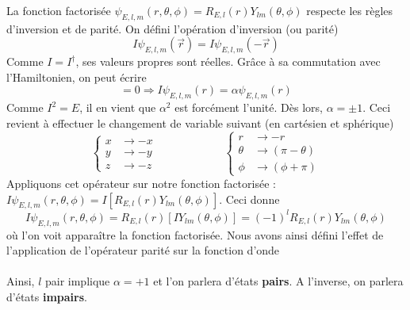 La fonction factorisée $\psi_{E,l,m}(r,\theta,\phi) = R_{E,l}(r)Y_{lm}(\theta,\phi)$ respecte les règles 
d'inversion et de parité. On défini l'opération d'inversion (ou parité)
\begin{equation}
I\psi_{E,l,m}(\vec{r}) = I\psi_{E,l,m}(-\vec{r})
\end{equation}
Comme $I = I^\dagger$, ses valeurs propres sont réelles. Grâce à sa commutation avec l'Hamiltonien, on peut
écrire
\begin{equation}
[H,I]=0\Rightarrow I\psi_{E,l,m}(r)=\alpha\psi_{E,l,m}(r)
\end{equation}
Comme $I^2=E$, il en vient que $\alpha^2$ est forcément l'unité. Dès lors, $\alpha = \pm1$. Ceci revient à 
effectuer le changement de variable suivant (en cartésien et sphérique)
\begin{equation}
\left\{\begin{array}{ll}
x &\to -x\\
y &\to -y\\
z &\to -z
\end{array}\right. \qquad\qquad\qquad\left\{\begin{array}{ll}
r &\to -r\\
\theta &\to (\pi-\theta)\\
\phi &\to (\phi+\pi)
\end{array}\right. 
\end{equation}
Appliquons cet opérateur sur notre fonction factorisée :$I\psi_{E,l,m}(r,\theta,\phi) = I[R_{E,l}(r)Y_{lm}(\theta,
\phi)]$. Ceci donne
\begin{equation}
I\psi_{E,l,m}(r,\theta,\phi) = R_{E,l}(r)[IY_{lm}(\theta,\phi)] = (-1)^lR_{E,l}(r)Y_{lm}(\theta,\phi)
\end{equation}
où l'on voit apparaître la fonction factorisée. Nous avons ainsi défini l'effet de l'application de l'opérateur
parité sur la fonction d'onde \\

\ \\

Ainsi, $l$ pair implique $\alpha=+1$ et l'on parlera d'états \textbf{pairs}. A l'inverse, on parlera d'états
\textbf{impairs}.




